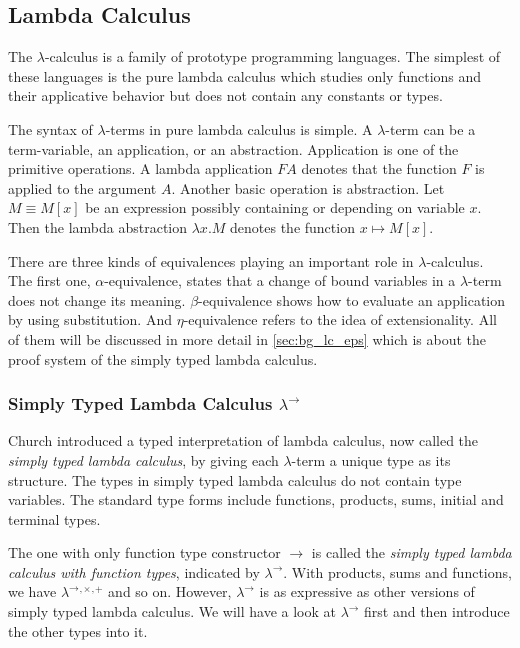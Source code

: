 \subsection{Lambda Calculus}
\label{sec:bg_lc}
The $ \lambda $-calculus is a family of prototype programming languages. The simplest of these languages is the pure lambda calculus which studies only functions and their applicative behavior but does not contain any constants or types.

The syntax of $ \lambda $-terms in pure lambda calculus is simple. A $ \lambda $-term can be a term-variable, an application, or an abstraction. Application is one of the primitive operations. A lambda application $ F A $ denotes that the function $ F $ is applied to the argument $ A $. Another basic operation is abstraction. Let $ M \equiv M[x] $ be an expression possibly containing or depending on variable $ x $. Then the lambda abstraction $ \lambda x.M $ denotes the function $ x \mapsto M[x] $.

There are three kinds of equivalences playing an important role in $ \lambda $-calculus. The first one, $ \alpha $-equivalence, states that a change of bound variables in a $ \lambda $-term does not change its meaning. $ \beta $-equivalence shows how to evaluate an application by using substitution. And $ \eta $-equivalence refers to the idea of extensionality. All of them will be discussed in more detail in \ref{sec:bg_lc_eps} which is about the proof system of the simply typed lambda calculus.


\subsubsection{Simply Typed Lambda Calculus $ \lambda ^\to $}
\label{sec:bg_lc_stlc}
Church introduced a typed interpretation of lambda calculus, now called the \emph{simply typed lambda calculus}, by giving each $ \lambda $-term a unique type as its structure. The types in simply typed lambda calculus do not contain type variables. The standard type forms include functions, products, sums, initial and terminal types.

The one with only function type constructor $ \to $ is called the \emph{simply typed lambda calculus with function types}, indicated by $ \lambda ^\to $. With products, sums and functions, we have $ \lambda ^\to{}^,{}^\times{}^,{}^+ $ and so on. However, $ \lambda ^\to $ is as expressive as other versions of simply typed lambda calculus. We will have a look at $ \lambda ^\to $ first and then introduce the other types into it.

